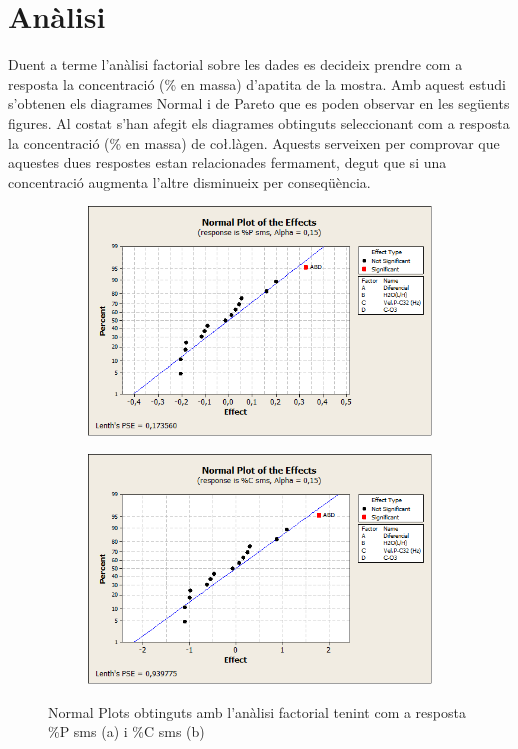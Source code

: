 \documentclass[a4paper]{article}
\begin{document}
\section{Anàlisi}
Duent a terme l’anàlisi factorial sobre les dades es decideix prendre com a resposta la concentració (\% en massa) d’apatita de la mostra. Amb aquest estudi s’obtenen els diagrames Normal i de Pareto que es poden observar en les següents figures. Al costat s’han afegit els diagrames obtinguts seleccionant com a resposta la concentració (\% en massa) de co\l.làgen. Aquests serveixen per comprovar que aquestes dues respostes estan relacionades fermament, degut que si una concentració augmenta l’altre disminueix per conseqüència.
\begin{figure}[H]
	\begin{subfigure}{.5\textwidth}
		\centering
		\includegraphics[width=.9\linewidth]{images/NormalEffects15P}
		\caption{}
		\label{fig:NormalEffects15P}
	\end{subfigure}%
	\begin{subfigure}{.5\textwidth}
		\centering
		\includegraphics[width=.9\linewidth]{images/NormalEffects15C}
		\caption{}
		\label{fig:NormalEffects15C}
	\end{subfigure}
	\caption{Normal Plots obtinguts amb l’anàlisi factorial tenint com a resposta \%P sms (a) i \%C sms (b)}
	\label{fig:NormalEffects15}
\end{figure}
\end{document}

